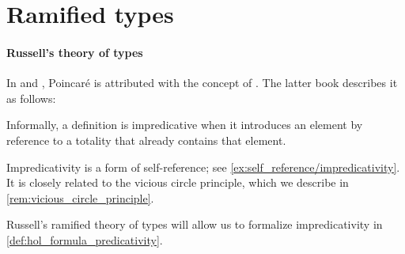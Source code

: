 \section{Ramified types}\label{sec:ramified_types}

\paragraph{Russell's theory of types}

\begin{concept}\label{con:impredicative_definition}
  In \cite[42]{Kleene1971Metamathematics} and \cite[146]{GowersEtAl2008PrincetonCompanion}, Poincar\'e is attributed with the concept of . The latter book describes it as follows:
  \begin{displayquote}
    Informally, a definition is impredicative when it introduces an element by reference to a totality that already contains that element.
  \end{displayquote}
\end{concept}
\begin{comments}
  \item Impredicativity is a form of self-reference; see \cref{ex:self_reference/impredicativity}. It is closely related to the vicious circle principle, which we describe in \cref{rem:vicious_circle_principle}.

  \item Russell's ramified theory of types will allow us to formalize impredicativity in \cref{def:hol_formula_predicativity}.
\end{comments}

